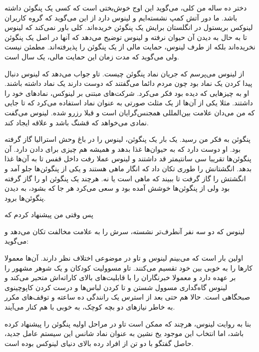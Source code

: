 \begin{journal}
دختر ده ساله من کلی، می‌گوید این اوج خوش‌بختی است که کسی یک پنگوئن داشته
باشد. ما دور آتش کمپ نشسته‌ایم و لینوس دارد از این می‌گوید که گروه
کاربران لینوکس بریستول در انگلستان برایش یک پنگوئن خریده‌اند. کلی باور
نمی‌کند که لینوس تا به حال به دیدن آن حیوان نرفته و لینوس توضیح می‌دهد
که آنها در اصل یک پنگوئن نخریده‌اند بلکه از طرف لینوس، حمایت مالی از یک
پنگوئن را پذیرفته‌اند. مطمئن نیست ولی می‌گوید که مدت زمان این حمایت
مالی، یک سال است.

از لینوس می‌پرسم که جریان نماد پنگوئن چیست. تاو جواب می‌دهد که
 لینوس دنبال پیدا کردن یک نماد بود چون
مردم دائما می‌گفتند که دوست دارند یک نماد داشته باشند. او به چیزهایی که
دیده بود فکر می‌کرد. شرکت‌های مبتنی بر لینوکس، نمادهای خود را
داشتند. مثلا یکی از آن‌ها از یک مثلث صورتی به عنوان نماد استفاده می‌کرد
که تا جایی که من می‌دان علامت بین‌المللی همجنس‌گرایان است و قبلا رزرو
شده. لینوس می‌گفت نمادی می‌خواهد که قشنگ باشد و علاقه ایجاد کند.

پنگوئن به فکر من رسید. یک بار یک پنگوئن، لینوس را در باغ وحش استرالیا
گاز گرفته بود. او دوست دارد که به حیوان‌ها غذا بدهد و همیشه هم چیزی
برای دادن دارد. آن پنگوئن‌ها تقریبا سی سانتیمتر قد داشتند و لینوس عملا
رفت داخل قفس تا به آن‌ها غذا بدهد. انگشتانش را طوری تکان داد که انگار
ماهی هستند و یکی از پنگوئن‌ها جلو آمد و انگشتش را گاز گرفت تا ببیند که
ماهی است یا نه. هرچند یک پنگوئن او را گاز گرفته بود ولی از پنگوئن‌ها
خوشش آمده بود و سعی می‌کرد هر جا که بشود،‌ به دیدن پنگوئن‌ها برود.

پس وقتی من پیشنهاد کردم که 

لینوس که دو سه نفر آنطرف‌تر نشسته، سرش را به علامت مخالفت تکان می‌دهد و
می‌گوید: 

اولین بار است که می‌بینم لینوس و تاو در موضوعی اختلاف نظر دارند. آن‌ها
معمولا کارها را به خوبی بین خود تقسیم می‌کنند. تاو مسوولیت کودکان و یک
شوهر مشهور را بر عهده دارد و معمولا خبرنگاران را با قابلیت‌های بالای
کاراته‌اش متحیر می‌کند و لینوس گاه‌گداری مسوول شستن و تا کردن لباس‌ها و
درست کردن کاپوچینوی صبحگاهی است. حالا هم حتی بعد از استرس یک رانندگی
ده ساعته و توقف‌های مکرر به خاطر نیازهای دو بچه کوچک، به خوبی با هم
کنار می‌آیند.

بنا به روایت لینوس، هرچند که ممکن است تاو در مراحل اولیه پنگوئن را
پیشنهاد کرده باشد، اما انتخاب این موجود یخ نشین به عنوان نماد شانس این
سیستم عامل جدید، حاصل گفتگو با دو تن از افراد رده بالای دنیای لینوکس
بوده است.


\end{journal}
